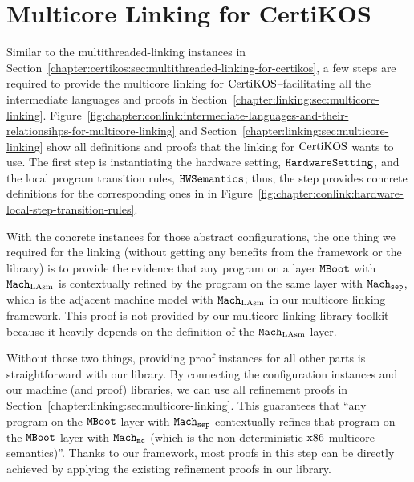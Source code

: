 \section{Multicore Linking for CertiKOS}
\label{chapter:certikos:sec:multicore-linking-for-certikos}


Similar to the multithreaded-linking instances in Section~\ref{chapter:certikos:sec:multithreaded-linking-for-certikos}, a few steps are required  to provide the multicore linking for $\mathrm{CertiKOS}$--facilitating all the intermediate languages
and proofs in Section~\ref{chapter:linking:sec:multicore-linking}.
Figure~\ref{fig:chapter:conlink:intermediate-languages-and-their-relationsihps-for-multicore-linking} and 
Section~\ref{chapter:linking:sec:multicore-linking} show all definitions and 
proofs that the linking for $\mathrm{CertiKOS}$ wants to use. 
The first step is instantiating the hardware setting, ${{\mathrm{\texttt{HardwareSetting}}}}$, and the local program transition rules, ${{\mathrm{\texttt{HWSemantics}}}}$;
thus, the step provides concrete definitions for the corresponding ones in 
 in Figure~\ref{fig:chapter:conlink:hardware-local-step-transition-rules}.

With the concrete instances for those abstract configurations, 
the one thing  we required for the linking (without getting any benefits from the framework or the library)
is to provide the evidence that any program on a layer ${\mathrm{\texttt{MBoot}}}$  with ${\mathrm{\texttt{Mach}}}_{\mathrm{LAsm}}$ is contextually refined by the program on the same layer with ${{{\mathrm{\texttt{Mach}}}}_{{\mathrm{\texttt{sep}}}}}$, which is the adjacent machine model with ${\mathrm{\texttt{Mach}}}_{\mathrm{LAsm}}$ in our multicore linking framework. This proof is not provided by our multicore linking library toolkit because it heavily depends on the definition of the ${\mathrm{\texttt{Mach}}}_{\mathrm{LAsm}}$ layer.

Without those two things, providing proof instances for all other parts is straightforward with our library. 
By connecting the configuration instances and our machine (and proof) libraries, 
we can use all refinement proofs in Section~\ref{chapter:linking:sec:multicore-linking}. 
This guarantees that ``any program on the ${\mathrm{\texttt{MBoot}}}$ layer with ${{{\mathrm{\texttt{Mach}}}}_{{\mathrm{\texttt{sep}}}}}$ contextually refines that program on the ${\mathrm{\texttt{MBoot}}}$ layer with ${{{{\mathrm{\texttt{Mach}}}}_{\mathrm{\texttt{mc}}}}}$ (which is the non-deterministic $\mathrm{x86}$ multicore semantics)''.
Thanks to our framework, most proofs in this step can be directly achieved by applying the existing refinement proofs in our library.
%
